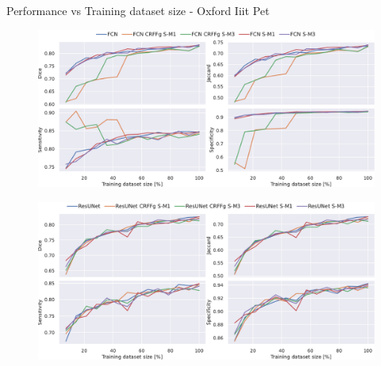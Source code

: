 \documentclass[aspectratio=169]{beamer}
\begin{document}
\begin{frame}[allowframebreaks]{Performance vs Training dataset size - Oxford Iiit Pet}
    
\begin{figure}
        \centering \includegraphics[width=0.9\linewidth]{Figures/training_partition_oxford_FCN.pdf}
\end{figure}

\framebreak

\begin{figure}
        \centering \includegraphics[width=0.9\linewidth]{Figures/training_partition_oxford_ResUNet.pdf}
\end{figure}




\end{frame}
\end{document}
